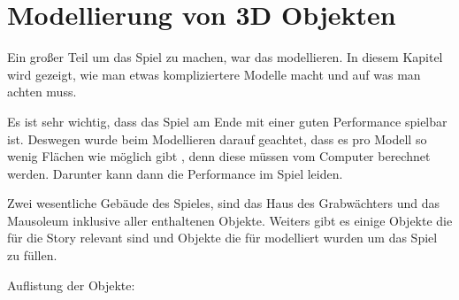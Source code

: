 \section{Modellierung von 3D Objekten}
Ein großer Teil um das Spiel zu machen, war das modellieren. In diesem Kapitel wird gezeigt, wie man etwas kompliziertere
Modelle macht und auf was man achten muss.

Es ist sehr wichtig, dass das Spiel am Ende mit einer guten Performance spielbar ist. Deswegen wurde beim Modellieren darauf geachtet,
dass es pro Modell so wenig Flächen wie möglich gibt \citep{unreal:modellierungVon3dObjekten_performance}, denn diese müssen vom Computer berechnet werden.
Darunter kann dann die Performance im Spiel leiden.

Zwei wesentliche Gebäude des Spieles, sind das Haus des Grabwächters und das Mausoleum inklusive aller enthaltenen Objekte.
Weiters gibt es einige Objekte die für die Story relevant sind und Objekte die für modelliert wurden um das Spiel zu füllen.

Auflistung der Objekte:

